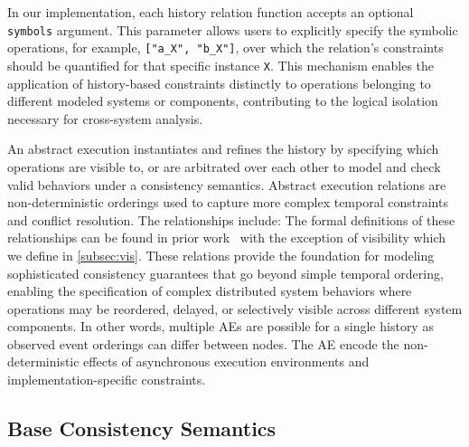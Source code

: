 In our implementation, each history relation function accepts an optional
\texttt{symbols} argument. This parameter allows users to
explicitly specify the symbolic operations, for example, \texttt{["a\_X",
"b\_X"]}, over which the relation's constraints should be quantified
for that specific instance \texttt{X}. This mechanism enables the application of
history-based constraints distinctly to operations belonging to
different modeled systems or components, contributing to the logical
isolation necessary for cross-system analysis.

An abstract execution instantiates and refines the history by
specifying which operations are visible to, or are arbitrated over
each other to model and check valid behaviors under a consistency semantics.
Abstract execution relations are non-deterministic
orderings used to capture more complex temporal constraints and
conflict resolution. The relationships include:
The formal definitions of these relationships can be found in prior
work~\cite{burckhardt2014principles,viotti2016consistency}
with the exception of visibility which we define in \cref{subsec:vis}.
These relations provide the foundation
for modeling sophisticated consistency guarantees that go beyond
simple temporal ordering, enabling the specification of complex
distributed system behaviors where operations may be reordered,
delayed, or selectively visible across different system components.
In other words, multiple AEs are possible for a
single history as observed event orderings can differ between nodes.
The AE encode the non-deterministic effects of asynchronous execution
environments and implementation-specific constraints.

\subsection{Base Consistency Semantics}
\label{subsec:semdef}

